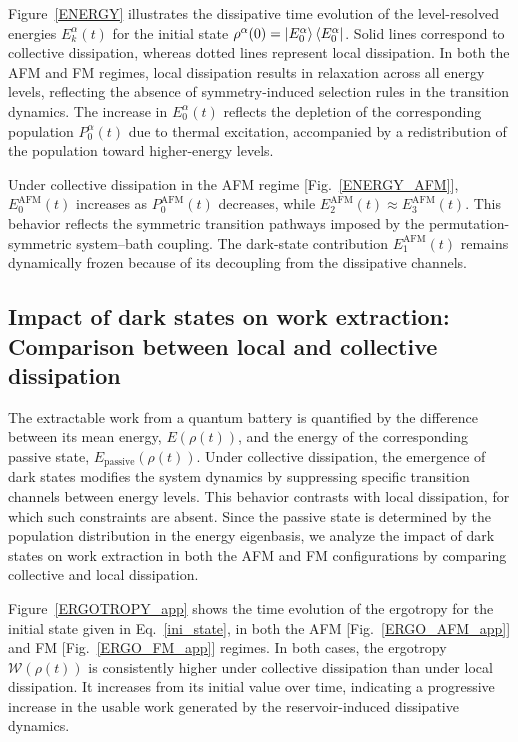 \documentclass[aps,superscriptaddress,twocolumn,pre,longbibliography,floatfix]{revtex4-1}
\begin{document}
	Figure~\ref{ENERGY} illustrates the dissipative time evolution of the
	level-resolved energies $E_k^\alpha(t)$ for the initial state
	$\rho^{\alpha}(0)=\ket{E_0^\alpha}\bra{E_0^\alpha}$. Solid lines correspond
	to collective dissipation, whereas dotted lines represent local dissipation.
	In both the AFM and FM regimes, local dissipation results in relaxation across
	all energy levels, reflecting the absence of symmetry-induced selection
	rules in the transition dynamics. The increase in $E_0^\alpha(t)$ reflects
	the depletion of the corresponding population $P_0^\alpha(t)$ due to thermal
	excitation, accompanied by a redistribution of the population toward
	higher-energy levels.
	
	Under collective dissipation in the AFM regime
	[Fig.~\ref{ENERGY_AFM}], $E_0^{\mathrm{AFM}}(t)$ increases as
	$P_0^{\mathrm{AFM}}(t)$ decreases, while
	$E_2^{\mathrm{AFM}}(t)\approx E_3^{\mathrm{AFM}}(t)$. This behavior reflects
	the symmetric transition pathways imposed by the permutation-symmetric
	system–bath coupling. The dark-state contribution
	$E_1^{\mathrm{AFM}}(t)$ remains dynamically frozen because of its decoupling
	from the dissipative channels.
	
	
	\subsection{Impact of dark states on work extraction: Comparison between local and collective dissipation}
	
	The extractable work from a quantum battery is quantified by the difference between its mean energy, $E(\rho(t))$, and the energy of the corresponding passive state, $E_{\mathrm{passive}}(\rho(t))$. Under collective dissipation, the emergence of dark states modifies the system dynamics by suppressing specific transition channels between energy levels. This behavior contrasts with local dissipation, for which such constraints are absent. Since the passive state is determined by the population distribution in the energy eigenbasis, we analyze the impact of dark states on work extraction in both the AFM and FM configurations by comparing collective and local dissipation.
	
	Figure~\ref{ERGOTROPY_app} shows the time evolution of the ergotropy for the initial state given in Eq.~\eqref{ini_state}, in both the AFM [Fig.~\ref{ERGO_AFM_app}] and FM [Fig.~\ref{ERGO_FM_app}] regimes. In both cases, the ergotropy $\mathcal{W}(\rho(t))$ is consistently higher under collective dissipation than under local dissipation. It increases from its initial value over time, indicating a progressive increase in the usable work generated by the reservoir-induced dissipative dynamics.
	
\end{document}
